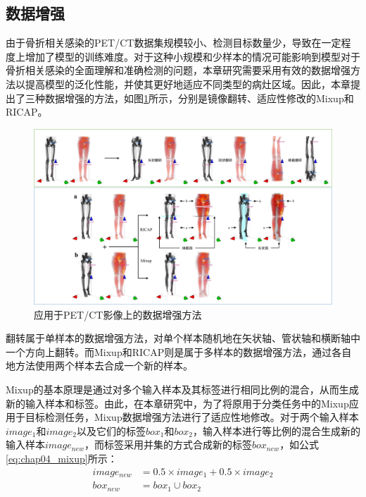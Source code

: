 \subsection{数据增强}

由于骨折相关感染的PET/CT数据集规模较小、检测目标数量少，导致在一定程度上增加了模型的训练难度。对于这种小规模和少样本的情况可能影响到模型对于骨折相关感染的全面理解和准确检测的问题，本章研究需要采用有效的数据增强方法以提高模型的泛化性能，并使其更好地适应不同类型的病灶区域。因此，本章提出了三种数据增强的方法，如图\ref{fig:chap04_augmentation}所示，分别是镜像翻转、适应性修改的Mixup和RICAP。

\begin{figure}
    \centering
    \includegraphics[height=\textwidth, width=0.95\textheight,angle=90,keepaspectratio]{figures/chap04_augmentation.jpg}
    \caption{应用于PET/CT影像上的数据增强方法}
    \label{fig:chap04_augmentation}
\end{figure}

翻转属于单样本的数据增强方法，对单个样本随机地在矢状轴、管状轴和横断轴中一个方向上翻转。而Mixup和RICAP则是属于多样本的数据增强方法，通过各自地方法使用两个样本去合成一个新的样本。

Mixup的基本原理是通过对多个输入样本及其标签进行相同比例的混合，从而生成新的输入样本和标签。由此，在本章研究中，为了将原用于分类任务中的Mixup应用于目标检测任务，Mixup数据增强方法进行了适应性地修改。对于两个输入样本\(image_1\)和\(image_2\)以及它们的标签\(box_1\)和\(box_2\)，输入样本进行等比例的混合生成新的输入样本\(image_{new}\)，而标签采用并集的方式合成新的标签\(box_{new}\)，如公式\ref{eq:chap04_mixup}所示：
\begin{equation}
    \begin{aligned}
        image_{new} & = 0.5 \times image_1 + 0.5 \times image_2 \\
        box_{new}   & = box_1 \cup box_2
    \end{aligned}
    \label{eq:chap04_mixup}
\end{equation}

